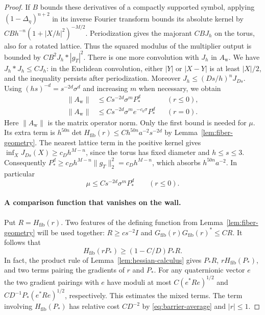 \begin{proof}
If $B$ bounds these derivatives of a compactly supported symbol, applying
$(1-\Delta_\eta)^{n+2}$ in its inverse Fourier transform bounds its
absolute kernel by $CB h^{-n}(1+|X/h|^2)^{-M/2}$. Periodization gives
the majorant $CBJ_h$ on the torus, also for a rotated lattice. Thus
the squared modulus of the multiplier output is bounded by
$C B^2 J_h*|g_T|^2$. There is one more convolution with $J_h$ in
$A_{\mathrm w}$. We have $J_h*J_h\le C J_h$: in the Euclidean
convolution, either $|Y|$ or $|X-Y|$ is at least $|X|/2$, and the
inequality persists after periodization. Moreover
$J_h\le(Ds/h)^nJ_{Ds}$. Using $(hs)^{-d}=s^{-2d}\sigma^d$ and
increasing $m$ when necessary, we obtain
\begin{align}
 \|A_{\mathrm w}\|&\le Cs^{-2d}\sigma^m P_*^d
              &&(r\le0),\nonumber\\
 \|A_{\mathrm w}\|&\le Cs^{-2d}\sigma^m e^{-c_0\sigma}P_*^d
              &&(r=0).\label{eq:barrier-current}
\end{align}
Here $\|A_{\mathrm w}\|$ is the matrix operator norm. Only the first
bound is needed for $\mu$. Its extra term is
$h^{50n}\det H_{\mathrm{fib}}(r)\le Ch^{50n}a^{-2}s^{-2d}$ by
Lemma~\ref{lem:fiber-geometry}. The nearest lattice term in the positive
kernel gives $\inf_X J_{Ds}(X)\ge c_D h^{M-n}$, since the torus has fixed
diameter and $h\le s\le3$. Consequently
$P_*^d\ge c_D h^{M-n}\|g_T\|_2^2=c_D h^{M-n}$, which absorbs
$h^{50n}a^{-2}$. In particular
\begin{equation}\label{eq:barrier-density}
 \mu\le C s^{-2d}\sigma^m P_*^d\qquad(r\le0).
\end{equation}

\paragraph{A comparison function that vanishes on the wall.}
Put $R=H_{\mathrm{fib}}(r)$. Two features of the defining function
from Lemma~\ref{lem:fiber-geometry} will be used together:
$R\ge c s^{-2}I$ and
$G_{\mathrm{fib}}(r)G_{\mathrm{fib}}(r)^*\le C R$. It follows that
\begin{equation}\label{eq:barrier-product}
 H_{\mathrm{fib}}(rP_*)\ge (1-C/D)P_*R.
\end{equation}
In fact, the product rule of Lemma~\ref{lem:hessian-calculus} gives
$P_*R$, $rH_{\mathrm{fib}}(P_*)$, and two terms pairing the gradients
of $r$ and $P_*$. For any quaternionic vector $e$ the two gradient
pairings with $e$ have moduli at most $C(e^*Re)^{1/2}$ and
$C D^{-1}P_*(e^*Re)^{1/2}$, respectively. This estimates the mixed
terms. The term involving $H_{\mathrm{fib}}(P_*)$ has relative cost
$C D^{-2}$ by \eqref{eq:barrier-average} and $|r|\le1$.


\end{proof}

